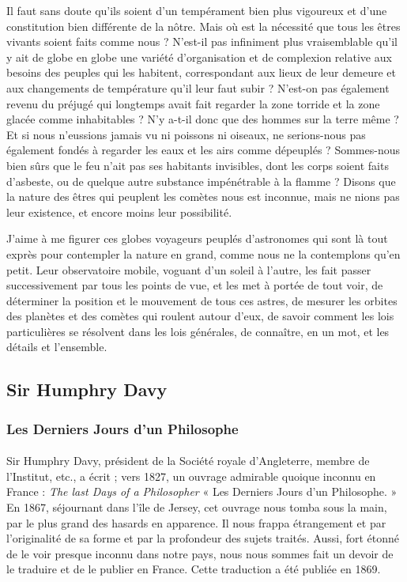 \documentclass[a4paper, 11pt, oneside]{article}
\begin{document}
Il faut sans doute qu'ils soient d'un tempérament bien plus vigoureux et d'une constitution bien différente de la nôtre. Mais où est la nécessité que tous les êtres vivants soient faits comme nous ? N'est-il pas infiniment plus vraisemblable qu'il y ait de globe en globe une variété d'organisation et de complexion relative aux besoins des peuples qui les habitent, correspondant aux lieux de leur demeure et aux changements de température qu'il leur faut subir ? N'est-on pas également revenu du préjugé qui longtemps avait fait regarder la zone torride et la zone glacée comme inhabitables ? N'y a-t-il donc que des hommes sur la terre même ? Et si nous n'eussions jamais vu ni poissons ni oiseaux, ne serions-nous pas également fondés à regarder les eaux et les airs comme dépeuplés ? Sommes-nous bien sûrs que le feu n'ait pas ses habitants invisibles, dont les corps soient faits d'asbeste, ou de quelque autre substance impénétrable à la flamme ? Disons que la nature des êtres qui peuplent les comètes nous est inconnue, mais ne nions pas leur existence, et encore moins leur possibilité.

J'aime à me figurer ces globes voyageurs peuplés d'astronomes qui sont là tout exprès pour contempler la nature en grand, comme nous ne la contemplons qu'en petit. Leur observatoire mobile, voguant d'un soleil à l'autre, les fait passer successivement par tous les points de vue, et les met à portée de tout voir, de déterminer la position et le mouvement de tous ces astres, de mesurer les orbites des planètes et des comètes qui roulent autour d'eux, de savoir comment les lois particulières se résolvent dans les lois générales, de connaître, en un mot, et les détails et l'ensemble.
\clearpage
\subsection{Sir Humphry Davy}
\subsubsection{Les Derniers Jours d'un Philosophe}
\paragraph{}
Sir Humphry Davy, président de la Société royale d'Angleterre, membre de l'Institut, etc., a écrit ; vers 1827, un ouvrage admirable quoique inconnu en France : \emph{The last Days of a Philosopher} « Les Derniers Jours d'un Philosophe. » En 1867, séjournant dans l'île de Jersey, cet ouvrage nous tomba sous la main, par le plus grand des hasards en apparence. Il nous frappa étrangement et par l'originalité de sa forme et par la profondeur des sujets traités. Aussi, fort étonné de le voir presque inconnu dans notre pays, nous nous sommes fait un devoir de le traduire et de le publier en France. Cette traduction a été publiée en 1869.
\end{document}
